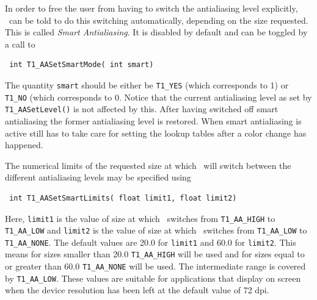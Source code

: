 In order to free the user from having to switch the antialiasing level explicitly,
\tonelib\ can be told to do this switching
automatically, depending on the size requested. This is called {\em Smart
  Antialiasing}. It is disabled by default and can be toggled by a call to 
\precorr
\begin{verbatim}
 int T1_AASetSmartMode( int smart)
\end{verbatim}\postcorr
The quantity \verb+smart+ should be either be \verb+T1_YES+ (which corresponds
to 1) or \verb+T1_NO+ (which corresponds to 0. Notice that the current
antialiasing level as set by \verb+T1_AASetLevel()+ is not affected by
this. After having switched off smart antialiasing the former antialiasing
level is restored. When smart antialiasing is active still has to take care
for setting the lookup tables after a color change has happened.

The numerical limits of the requested size at which \tonelib\ will switch
between the different antialiasing levels may be specified using 
\precorr
\begin{verbatim}
 int T1_AASetSmartLimits( float limit1, float limit2)
\end{verbatim}\postcorr
Here, \verb+limit1+ is the value of size at which \tonelib\ switches from
\verb+T1_AA_HIGH+ to \verb+T1_AA_LOW+ and \verb+limit2+ is the value of size
at which \tonelib\ switches from \verb+T1_AA_LOW+ to \verb+T1_AA_NONE+. The
default values are 20.0 for \verb+limit1+ and 60.0 for \verb+limit2+. This
means for sizes smaller than 20.0 \verb+T1_AA_HIGH+ will be used and for sizes
equal to or greater than 60.0 \verb+T1_AA_NONE+ will be used. The intermediate
range is covered by \verb+T1_AA_LOW+. These values are suitable for
applications that display on screen when the device resolution has been left
at the default value of 72 dpi.


